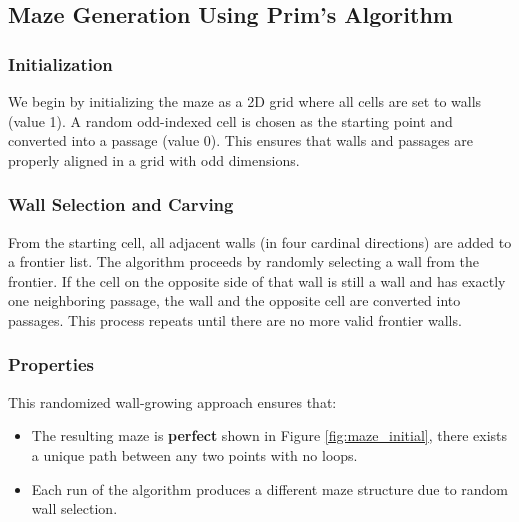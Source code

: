 \documentclass[a4paper, journal]{IEEEtran}
\begin{document}
\subsection{Maze Generation Using Prim’s Algorithm}

\subsubsection{Initialization}
We begin by initializing the maze as a 2D grid where all cells are set to walls (value 1). A random odd-indexed cell is chosen as the starting point and converted into a passage (value 0). This ensures that walls and passages are properly aligned in a grid with odd dimensions.

\subsubsection{Wall Selection and Carving}
From the starting cell, all adjacent walls (in four cardinal directions) are added to a frontier list. The algorithm proceeds by randomly selecting a wall from the frontier. If the cell on the opposite side of that wall is still a wall and has exactly one neighboring passage, the wall and the opposite cell are converted into passages. This process repeats until there are no more valid frontier walls.

\subsubsection{Properties}
This randomized wall-growing approach ensures that:
\begin{itemize}
    \item The resulting maze is \textbf{perfect} shown in Figure \ref{fig:maze_initial}, there exists a unique path between any two points with no loops.
    \item Each run of the algorithm produces a different maze structure due to random wall selection.
\end{itemize}
\end{document}
